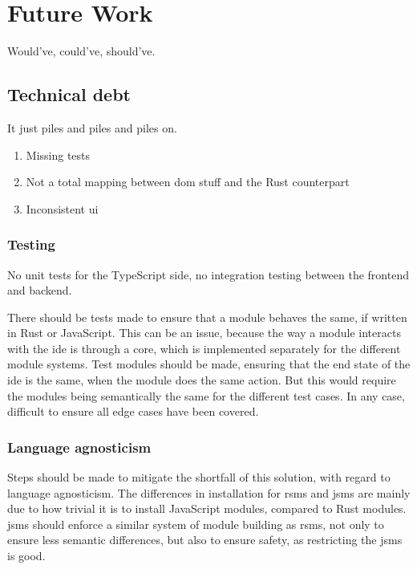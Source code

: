 \chapter{Future Work} \label{cha:future}

Would've, could've, should've.


\section{Technical debt}

It just piles and piles and piles on.

\begin{enumerate}
  \item Missing tests
  \item Not a total mapping between \gls*{dom} stuff and the Rust counterpart
  \item Inconsistent \gls*{ui}
\end{enumerate}


\subsection{Testing}

No unit tests for the TypeScript side, no integration testing between the
frontend and backend.

There should be tests made to ensure that a module behaves the same, if written
in Rust or JavaScript. This can be an issue, because the way a module interacts
with the \gls*{ide} is through a core, which is implemented separately for the
different module systems. Test modules should be made, ensuring that the end
state of the \gls*{ide} is the same, when the module does the same action. But
this would require the modules being semantically the same for the different
test cases. In any case, difficult to ensure all edge cases have been covered.

\subsection{Language agnosticism}

Steps should be made to mitigate the shortfall of this solution, with regard to
language agnosticism. The differences in installation for \gls*{rsms} and
\gls*{jsms} are mainly due to how trivial it is to install JavaScript modules,
compared to Rust modules. \gls*{jsms} should enforce a similar system of module
building as \gls*{rsms}, not only to ensure less semantic differences, but also
to ensure safety, as restricting the \gls*{jsms} is good.

